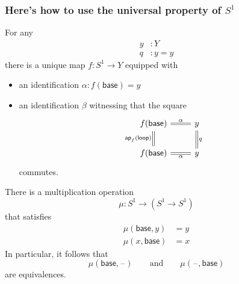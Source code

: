 \documentclass[handout]{beamer}
\newcommand{\sphere}[1]{S^{#1}}
\newcommand{\ap}{\mathsf{ap}}
\newcommand{\blank}{\mathord{\hspace{1pt}\text{--}\hspace{1pt}}}
\newcommand{\baseS}{\mathsf{base}}
\newcommand{\loopS}{\mathsf{loop}}
\newcommand{\apply}[2]{#1(#2)}
\begin{document}
\begin{frame}
  \frametitle{Here's how to use the universal property of $\sphere{1}$}
  For any
  \begin{align*}
    y & : Y \\
    q & : y = y
  \end{align*}
  there is a unique map $f:\sphere{1}\to Y$ equipped with
  \begin{itemize}
  \item an identification $\alpha:\apply{f}{\baseS}=y$
  \item an identification $\beta$ witnessing that the square
    \begin{equation*}
      \begin{tikzcd}[ampersand replacement=\&]
        \apply{f}{\baseS} \arrow[d,equals,swap,"\apply{\ap_f}{\loopS}"] \arrow[r,equals,"\alpha"] \& y \arrow[d,equals,"q"] \\
        \apply{f}{\baseS} \arrow[r,swap,equals,"\alpha"] \& y
      \end{tikzcd}
    \end{equation*}
    commutes.
  \end{itemize}
\end{frame}

\begin{frame}
  \begin{theorem}
    There is a multiplication operation
    \begin{equation*}
      \mu : \sphere{1}\to(\sphere{1}\to\sphere{1})
    \end{equation*}
    that satisfies
    \begin{align*}
      \apply{\mu}{\baseS,y} & = y \\
      \apply{\mu}{x,\baseS} & = x
    \end{align*}
    In particular, it follows that
    \begin{equation*}
      \apply{\mu}{\baseS,\blank} \qquad\text{and}\qquad\apply{\mu}{\blank,\baseS}
    \end{equation*}
    are equivalences.
  \end{theorem}
\end{frame}
\end{document}
